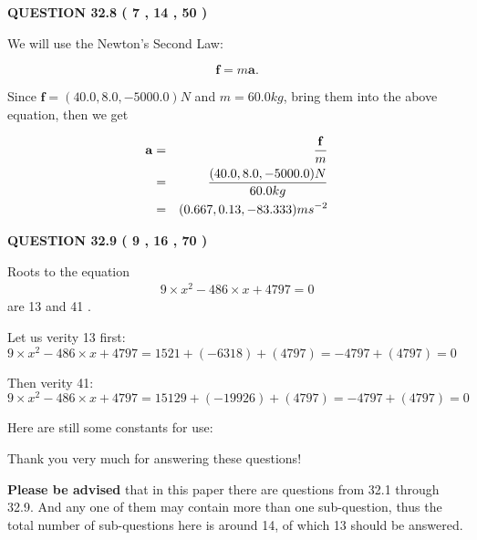 \documentclass[12pt]{article}
\begin{document}
  
 
 

 
 
  
\vspace{0.2in}
  
{\textbf{\Large{QUESTION
32.8 
 (           7 ,          14 ,          50 )
}}}
  
  
 
 

We will use the Newton's Second Law:
 
\[
\mathbf{f}=m\mathbf{a}.
\]
 
Since $\mathbf{f}= %
(40.0 , 8.0 , -5000.0) N$
and $m= %
60.0kg$, bring them into the above equation, then we get
 
\begin{eqnarray*}
\mathbf{a}&=&\frac{\mathbf{f}}m  \\
&=&\frac{ %
(40.0 , 8.0 , -5000.0) N}{ %
60.0kg}  \\
&=& %
(0.667 , 0.13 , -83.333) ms^{-2}
\end{eqnarray*}
 
 
 
  
\vspace{0.2in}
  
{\textbf{\Large{QUESTION
32.9 
 (           9 ,          16 ,          70 )
}}}
  
  


 
 

Roots to the equation
\begin{eqnarray*}
9 \times x^2  %
-486
                 \times x    %
+  %
4797 =0
\end{eqnarray*}
are  %
13 and  %
41 .
 
Let us verity  %
13 first:
$  %
9 \times x^2  %
-486
                 \times x    %
+  %
4797
  = %
1521+( %
-6318)+( %
4797)
  = %
-4797+( %
4797)
  = %
0
$
 
Then verity  %
41:
$  %
9 \times x^2  %
-486
                 \times x    %
+  %
4797
  = %
15129+( %
-19926)+( %
4797)
  = %
-4797+( %
4797)
  = %
0
$
 
 
 
   
   
 \vspace{0.2in}
Here are still some constants for use:
 
 
 
 
Thank you very much for answering these questions!
 
{\textbf{\large{Please be advised}}} that in this paper there are questions from
32.1 through
32.9.
And any one of them may contain more than one sub-question, thus the total number
of sub-questions here is around 14, of which
13 should be answered.
 
\end{document}
